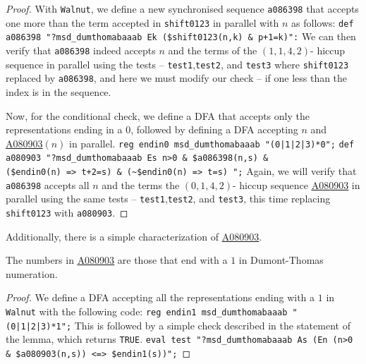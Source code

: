 \documentclass[12pt,reqno]{article}
\newcommand{\seqnum}[1]{\href{https://oeis.org/#1}{\rm \underline{#1}}}
\begin{document}
\begin{proof}
    With \texttt{Walnut}, we define a new synchronised sequence \texttt{a086398} that accepts one more than the term accepted in \texttt{shift0123} in parallel with $n$ as follows:
    \smallbreak\noindent\texttt{def a086398 "?msd\_dumthomabaaab Ek (\$shift0123(n,k) \& p+1=k)":}
    \smallbreak
    We can then verify that \texttt{a086398} indeed accepts $n$  and the terms of the $(1,1,4,2)$- hiccup sequence in parallel using the tests -- \texttt{test1},\texttt{test2}, and \texttt{test3} where \texttt{shift0123} replaced by \texttt{a086398}, and here we must modify our check -- if one less than the index is in the sequence.
    
    \noindent Now, for the conditional check, we define a DFA that accepts only the representations ending in a $0$, followed by defining a DFA accepting $n$ and \seqnum{A080903}$(n)$ in parallel.
    \smallbreak\noindent\texttt{reg endin0 msd\_dumthomabaaab "(0|1|2|3)*0";}
\smallbreak 
\smallbreak\noindent\texttt{def a080903 "?msd\_dumthomabaaab Es n>0 \& \$a086398(n,s) \& \\(\$endin0(n) => t+2=s) \& (\textasciitilde\$endin0(n) => t=s) ";}
\smallbreak 
Again, we will verify that \texttt{a086398} accepts all $n$ and the terms the $(0,1,4,2)$- hiccup sequence \seqnum{A080903} in parallel using the same tests -- \texttt{test1},\texttt{test2}, and \texttt{test3}, this time replacing \texttt{shift0123} with \texttt{a080903}.
\end{proof}

Additionally, there is a simple characterization of \seqnum{A080903}.
\begin{lemma}\label{LEM:endin1}
    The numbers in \seqnum{A080903} are those that end with a $1$ in Dumont-Thomas numeration.
\end{lemma}
\begin{proof}
    We define a DFA accepting all the representations ending with a $1$ in \texttt{Walnut} with the following code:
    \smallbreak\noindent\texttt{reg endin1 msd\_dumthomabaaab "(0|1|2|3)*1";}
\smallbreak 
\noindent
This is followed by a simple check described in the statement of the lemma, which returns \texttt{TRUE}.
\smallbreak\noindent\texttt{eval test "?msd\_dumthomabaaab As (En (n>0 \& \$a080903(n,s)) <=> \$endin1(s))";}
\smallbreak 
\end{proof}
\end{document}
